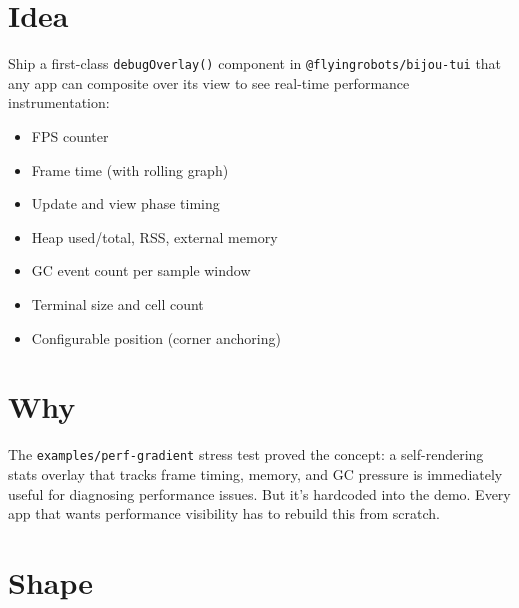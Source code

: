 \section{Idea}\label{record-338-idea}

Ship a first-class \texttt{d\allowbreak{}e\allowbreak{}b\allowbreak{}u\allowbreak{}g\allowbreak{}O\allowbreak{}v\allowbreak{}e\allowbreak{}r\allowbreak{}l\allowbreak{}a\allowbreak{}y\allowbreak{}(\allowbreak{})} component in \texttt{@\allowbreak{}f\allowbreak{}l\allowbreak{}y\allowbreak{}i\allowbreak{}n\allowbreak{}g\allowbreak{}r\allowbreak{}o\allowbreak{}b\allowbreak{}o\allowbreak{}t\allowbreak{}s\allowbreak{}/\allowbreak{}b\allowbreak{}i\allowbreak{}j\allowbreak{}o\allowbreak{}u\allowbreak{}-\allowbreak{}t\allowbreak{}u\allowbreak{}i} that any app can composite over its view to see real-time performance instrumentation:

\begin{itemize}
\tightlist
\item
  FPS counter
\item
  Frame time (with rolling graph)
\item
  Update and view phase timing
\item
  Heap used/total, RSS, external memory
\item
  GC event count per sample window
\item
  Terminal size and cell count
\item
  Configurable position (corner anchoring)
\end{itemize}

\section{Why}\label{record-338-why}

The \texttt{e\allowbreak{}x\allowbreak{}a\allowbreak{}m\allowbreak{}p\allowbreak{}l\allowbreak{}e\allowbreak{}s\allowbreak{}/\allowbreak{}p\allowbreak{}e\allowbreak{}r\allowbreak{}f\allowbreak{}-\allowbreak{}g\allowbreak{}r\allowbreak{}a\allowbreak{}d\allowbreak{}i\allowbreak{}e\allowbreak{}n\allowbreak{}t} stress test proved the concept: a self-rendering stats overlay that tracks frame timing, memory, and GC pressure is immediately useful for diagnosing performance issues. But it's hardcoded into the demo. Every app that wants performance visibility has to rebuild this from scratch.

\section{Shape}\label{record-338-shape}

